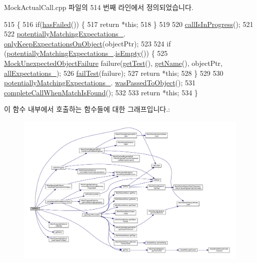 Mock\+Actual\+Call.\+cpp 파일의 514 번째 라인에서 정의되었습니다.


\begin{DoxyCode}
515 \{
516     \textcolor{keywordflow}{if}(\hyperlink{class_mock_checked_actual_call_ae4deec08ed507f9a2f1cced854fc5a16}{hasFailed}()) \{
517         \textcolor{keywordflow}{return} *\textcolor{keyword}{this};
518     \}
519 
520     \hyperlink{class_mock_checked_actual_call_a60fd1e06699e3f79444c4e7f8055ac4a}{callIsInProgress}();
521 
522     \hyperlink{class_mock_checked_actual_call_a4fc6bec7509ed6eb28096956758c030a}{potentiallyMatchingExpectations\_}.
      \hyperlink{class_mock_expected_calls_list_a4532e75c2db152553976d924441eba2a}{onlyKeepExpectationsOnObject}(objectPtr);
523 
524     \textcolor{keywordflow}{if} (\hyperlink{class_mock_checked_actual_call_a4fc6bec7509ed6eb28096956758c030a}{potentiallyMatchingExpectations\_}.\hyperlink{class_mock_expected_calls_list_a479432127ee77145cc19d6a2d1590821}{isEmpty}()) \{
525         \hyperlink{class_mock_unexpected_object_failure}{MockUnexpectedObjectFailure} failure(\hyperlink{class_mock_checked_actual_call_aa10112b41f7ed20162b12633042bb775}{getTest}(), 
      \hyperlink{class_mock_checked_actual_call_ab9fb89f09ab681191e4eaa9221b42491}{getName}(), objectPtr, \hyperlink{class_mock_checked_actual_call_aed217603c4a32c8f55a3087ac4a64a78}{allExpectations\_});
526         \hyperlink{class_mock_checked_actual_call_a275e824525aa26cb8874437442cdc186}{failTest}(failure);
527         \textcolor{keywordflow}{return} *\textcolor{keyword}{this};
528     \}
529 
530     \hyperlink{class_mock_checked_actual_call_a4fc6bec7509ed6eb28096956758c030a}{potentiallyMatchingExpectations\_}.
      \hyperlink{class_mock_expected_calls_list_a9a3f1eec5ad45ccae942edb3073279de}{wasPassedToObject}();
531     \hyperlink{class_mock_checked_actual_call_aae5ca9ab18e1a3a03ab292e825e2ece6}{completeCallWhenMatchIsFound}();
532 
533     \textcolor{keywordflow}{return} *\textcolor{keyword}{this};
534 \}
\end{DoxyCode}


이 함수 내부에서 호출하는 함수들에 대한 그래프입니다.\+:
\nopagebreak
\begin{figure}[H]
\begin{center}
\leavevmode
\includegraphics[width=350pt]{class_mock_checked_actual_call_a05622f91f6d99311dedb4a2f821c12b2_cgraph}
\end{center}
\end{figure}


